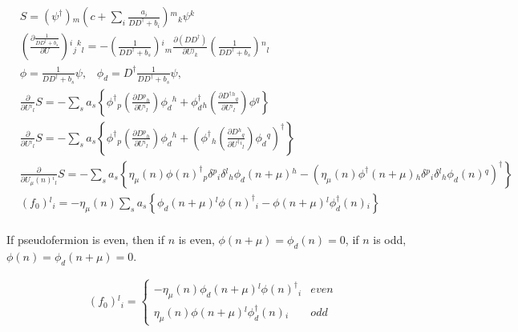 \begin{equation}
\begin{split}
&S=(\psi ^{\dagger}){}_m \left(c+\sum _i\frac{a_i}{DD^{\dagger}+b_i}\right){}^m{}_k \psi{}^k\\
&\left(\frac{\partial \frac{1}{DD^{\dagger}+b_s}}{\partial U}\right){}^i{}_j{}^k{}_l=-\left( \frac{1}{DD^{\dagger}+b_s}\right){}^i{}_m \frac{\partial (DD^{\dagger})}{\partial U{}^j{}_k} \left( \frac{1}{DD^{\dagger}+b_s}\right){}^n{}_l\\
&\phi  = \frac{1}{DD^{\dagger}+b_s}\psi, \;\;\;\phi _d = D^{\dagger}\frac{1}{DD^{\dagger}+b_s}\psi,\\
&\frac{\partial}{\partial U{}^i{}_l}S=-\sum _sa_s{} \left\{\phi ^{\dagger}{}_p\left(\frac{\partial D{}^p{}_h}{\partial U{}^i{}_l} \right) \phi _d {}^h+ 
\phi _d^{\dagger}{}_h\left(\frac{\partial D^{\dagger}{}^h{}_q}{\partial U{}^i{}_l}\right) \phi {}^q\right\}\\
&\frac{\partial}{\partial U{}^i{}_l}S=-\sum _sa_s{} \left\{\phi ^{\dagger}{}_p\left(\frac{\partial D{}^p{}_h}{\partial U{}^i{}_l} \right) \phi _d {}^h+ 
\left(\phi ^{\dagger}{}_h\left(\frac{\partial D{}^h{}_q}{\partial U^{\dagger}{}^i{}_l}\right) \phi _d {}^q\right)^{\dagger}\right\}\\
&\frac{\partial}{\partial U_{\mu}(n){}^i{}_l}S=-\sum _sa_s{} \left\{\eta_{\mu}(n)\phi(n) ^{\dagger}{}_p \delta {}^p{}_i \delta {}^l{}_h \phi _d(n+\mu) {}^h -\left( \eta _{\mu}(n) 
\phi ^{\dagger}(n+\mu){}_h \delta {}^p{}_i \delta {}^l{}_h \phi _d(n) {}^q\right)^{\dagger}\right\}\\
&(f_0){}^l{}_i=-\eta_{\mu}(n)\sum _sa_s{} \left\{ \phi _d(n+\mu) {}^l \phi(n) ^{\dagger}{}_i - \phi(n+\mu) {}^l \phi _d^{\dagger}(n){}_i\right\}\\
\end{split}
\end{equation}

If pseudofermion is even, then if $n$ is even, $\phi(n+\mu)=\phi_d(n)=0$, if $n$ is odd, $\phi(n)=\phi _d(n+\mu)=0$.

\begin{equation}
\begin{split}
&(f_0){}^l{}_i=\left\{\begin{array}{cc}-\eta_{\mu}(n) \phi _d(n+\mu) {}^l \phi(n) ^{\dagger}{}_i & even\\
                \eta_{\mu}(n)\phi(n+\mu) {}^l \phi _d^{\dagger}(n){}_i  & odd\end{array}\right.
\end{split}
\end{equation}

